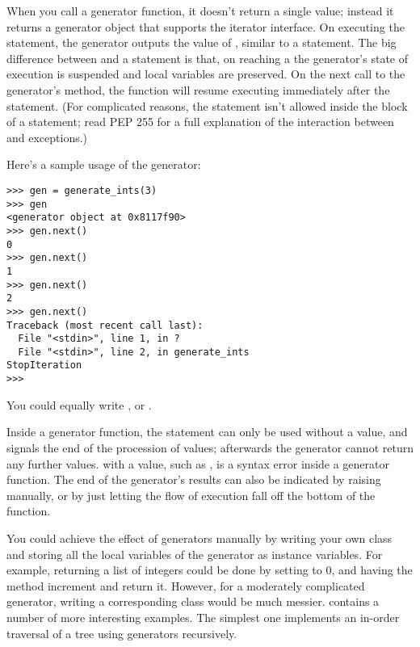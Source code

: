 \documentclass{howto}
\begin{document}
When you call a generator function, it doesn't return a single value;
instead it returns a generator object that supports the iterator
interface.  On executing the  statement, the generator
outputs the value of , similar to a 
statement.  The big difference between  and a
 statement is that, on reaching a  the
generator's state of execution is suspended and local variables are
preserved.  On the next call to the generator's  method,
the function will resume executing immediately after the
 statement.  (For complicated reasons, the
 statement isn't allowed inside the  block
of a  statement; read PEP 255 for a full
explanation of the interaction between  and
exceptions.)

Here's a sample usage of the  generator:

\begin{verbatim}
>>> gen = generate_ints(3)
>>> gen
<generator object at 0x8117f90>
>>> gen.next()
0
>>> gen.next()
1
>>> gen.next()
2
>>> gen.next()
Traceback (most recent call last):
  File "<stdin>", line 1, in ?
  File "<stdin>", line 2, in generate_ints
StopIteration
>>>
\end{verbatim}

You could equally write , or
.

Inside a generator function, the  statement can only
be used without a value, and signals the end of the procession of
values; afterwards the generator cannot return any further values.
 with a value, such as , is a syntax
error inside a generator function.  The end of the generator's results
can also be indicated by raising  manually,
or by just letting the flow of execution fall off the bottom of the
function.

You could achieve the effect of generators manually by writing your
own class and storing all the local variables of the generator as
instance variables.  For example, returning a list of integers could
be done by setting  to 0, and having the
 method increment  and return it.
However, for a moderately complicated generator, writing a
corresponding class would be much messier.
 contains a number of more
interesting examples.  The simplest one implements an in-order
traversal of a tree using generators recursively.
\end{document}
